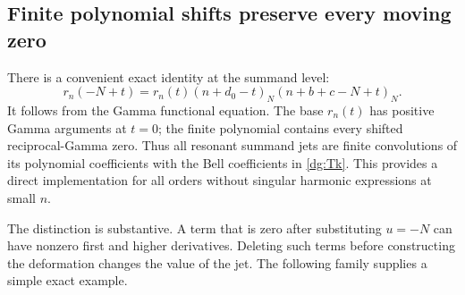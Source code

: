 \documentclass[11pt,a4paper]{article}
\numberwithin{equation}{section}
\theoremstyle{definition}
\theoremstyle{remark}
\begin{document}
\subsection{Finite polynomial shifts preserve every moving zero}
There is a convenient exact identity at the summand level:
\begin{equation}\label{dg:polynomialshift}
 \boxed{r_n(-N+t)=r_n(t)
             (n+d_0-t)_N(n+b+c-N+t)_N.}
\end{equation}
It follows from the Gamma functional equation. The base $r_n(t)$ has
positive Gamma arguments at $t=0$; the finite polynomial contains
every shifted reciprocal-Gamma zero. Thus all resonant summand jets
are finite convolutions of its polynomial coefficients with the Bell
coefficients in \eqref{dg:Tk}. This provides a direct implementation
for all orders without singular harmonic expressions at small $n$.

The distinction is substantive. A term that is zero after substituting
$u=-N$ can have nonzero first and higher derivatives. Deleting such
terms before constructing the deformation changes the value of the
jet. The following family supplies a simple exact example.
\end{document}
